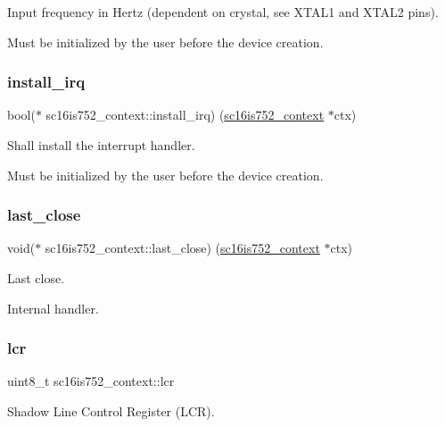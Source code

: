 Input frequency in Hertz (dependent on crystal, see X\+T\+A\+L1 and X\+T\+A\+L2 pins). 

Must be initialized by the user before the device creation. \mbox{\label{structsc16is752__context_adc361b215759553713977a11db263203}} 
\subsubsection{\texorpdfstring{install\_irq}{install\_irq}}
{\footnotesize\ttfamily bool($\ast$ sc16is752\+\_\+context\+::install\+\_\+irq) (\mbox{\hyperlink{structsc16is752__context}{sc16is752\+\_\+context}} $\ast$ctx)}



Shall install the interrupt handler. 

Must be initialized by the user before the device creation. \mbox{\label{structsc16is752__context_a857f5b36a05a5c6b303bd40df0af3968}} 
\subsubsection{\texorpdfstring{last\_close}{last\_close}}
{\footnotesize\ttfamily void($\ast$ sc16is752\+\_\+context\+::last\+\_\+close) (\mbox{\hyperlink{structsc16is752__context}{sc16is752\+\_\+context}} $\ast$ctx)}



Last close. 

Internal handler. \mbox{\label{structsc16is752__context_aed277df58b958f568687f4fc7fd760cc}} 
\subsubsection{\texorpdfstring{lcr}{lcr}}
{\footnotesize\ttfamily uint8\+\_\+t sc16is752\+\_\+context\+::lcr}



Shadow Line Control Register (L\+CR). 

